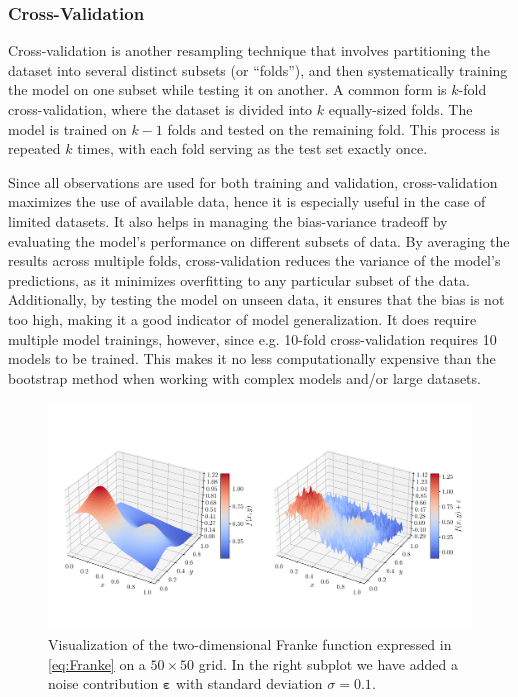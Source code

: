 \documentclass[aps,pra,english,notitlepage,reprint,nofootinbib]{revtex4-1}  %
\begin{document}
\vspace*{-2.5pt}
\subsubsection{Cross-Validation}
\vspace*{-2.5pt}
Cross-validation is another resampling technique that involves partitioning the dataset into several distinct subsets (or ``folds''), and then systematically training the model on one subset while testing it on another. A common form is $k$-fold cross-validation, where the dataset is divided into $k$ equally-sized folds. The model is trained on $k-1$ folds and tested on the remaining fold. This process is repeated $k$ times, with each fold serving as the test set exactly once.

Since all observations are used for both training and validation, cross-validation maximizes the use of available data, hence it is especially useful in the case of limited datasets. It also helps in managing the bias-variance tradeoff by evaluating the model's performance on different subsets of data. By averaging the results across multiple folds, cross-validation reduces the variance of the model's predictions, as it minimizes overfitting to any particular subset of the data. Additionally, by testing the model on unseen data, it ensures that the bias is not too high, making it a good indicator of model generalization. It does require multiple model trainings, however, since e.g. 10-fold cross-validation requires 10 models to be trained. This makes it no less computationally expensive than the bootstrap method when working with complex models and/or large datasets.

\begin{figure}
  \vspace*{-5pt}
  \centering %
  \includegraphics[trim=0 1.4cm 0 2cm,clip,width=\textwidth,keepaspectratio]{../figs/a_Franke_surf.pdf}
  \caption{Visualization of the two-dimensional Franke function expressed in \eqref{eq:Franke} on a $50\times50$ grid. In the right subplot we have added a noise contribution $\boldsymbol{\varepsilon}$ with standard deviation $\sigma=0.1$.}\label{fig:Franke}
  \vspace*{-5pt}
\end{figure}
\end{document}
